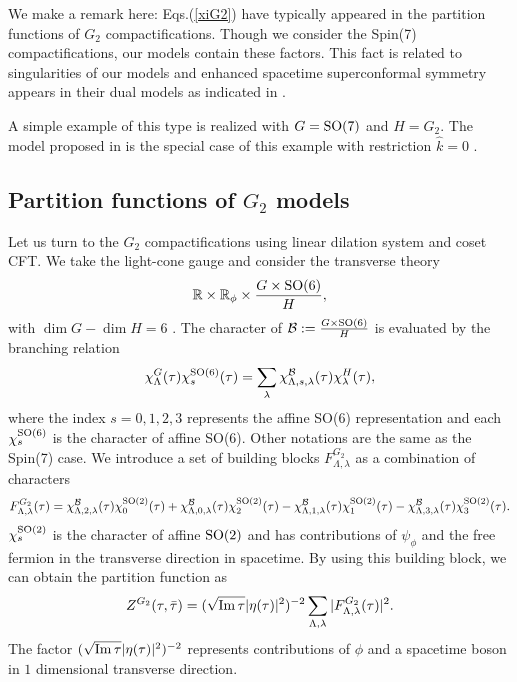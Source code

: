 \documentclass[a4paper,12pt]{article}
\numberwithin{equation}{section}
\newcommand{\Rb}{\mathbb{R}}
\newcommand{\im}{{\rm Im}\,}
\newcommand{\G}[1]{\mbox{$G_{#1}$}}
\newcommand{\Spin}[1]{{\rm Spin}(#1)}
\newcommand{\SO}[1]{{\rm SO}(#1)}
\newcommand{\psil}{\psi_{\phi}}
\newcommand{\kh}{\hat{k}}
\newcommand{\Bcal}{{\cal B}}
\begin{document}
We make a remark here: Eqs.(\ref{xiG2}) have typically appeared in the
partition functions of \G2
compactifications\cite{Eguchi:2001xa,Sugiyama:2001qh,Yamaguchi:2001kq}.
 Though we consider the \Spin7 compactifications, our models contain 
these factors.
This fact is related to singularities of our models and 
enhanced spacetime 
superconformal symmetry appears in their dual models as indicated in 
\cite{Yamaguchi:2001kq}.

A simple example of this type is realized 
with $G=\SO 7$ and $H=\G2$. The model
proposed in \cite{Eguchi:2001xa} is the special case of this example
with restriction $\kh=0$ .


\subsection{Partition functions of \G 2 models}
\label{G2CFT}
Let us turn to the \G2 compactifications using linear dilation system
and coset CFT. We take the light-cone gauge and consider the
transverse theory
\begin{align*}
 \Rb\times \Rb_{\phi}\times \frac{G\times \SO 6}{H},
\end{align*}
with $\dim G-\dim H=6$ . The character of 
$\Bcal:=\frac{G\times \SO 6}{H}$ is evaluated by the branching relation 
\begin{align*}
 \chi^{G}_{\Lambda}(\tau)\chi^{\SO6}_{s}(\tau)
   =\sum_{\lambda}\chi^{\Bcal}_{\Lambda,s,\lambda}(\tau)
             \chi^{H}_{\lambda}(\tau),
\end{align*}
where the index $s=0,1,2,3$ represents the affine \SO6 representation and
each $\chi^{\SO6}_{s}$ is the character of affine \SO6. Other notations
are the same as the \Spin7 case. We introduce a  set of building blocks
$F^{G_2}_{\Lambda,\lambda}$ as a combination of characters
\begin{align*}
 F^{G_2}_{\Lambda,\lambda}(\tau)=
    \chi^{\Bcal}_{\Lambda,2,\lambda}(\tau)\chi^{\SO2}_{0}(\tau)
   +\chi^{\Bcal}_{\Lambda,0,\lambda}(\tau)\chi^{\SO2}_{2}(\tau)
   -\chi^{\Bcal}_{\Lambda,1,\lambda}(\tau)\chi^{\SO2}_{1}(\tau)
   -\chi^{\Bcal}_{\Lambda,3,\lambda}(\tau)\chi^{\SO2}_{3}(\tau).
\end{align*}
$\chi^{\SO2}_{s}$ is the character of affine $\SO2$ and has
contributions 
of $\psil$ and the free fermion in the transverse  direction 
in spacetime.
By using this building block, 
we can obtain the partition function as
\begin{align*}
 Z^{G_2}(\tau ,\bar{\tau})=(\sqrt{\im\tau}|\eta(\tau)|^2)^{-2}
  \sum_{\Lambda,\lambda}|F^{G_2}_{\Lambda,\lambda}(\tau)|^2.
\end{align*}
The factor $(\sqrt{\im\tau}|\eta(\tau)|^2)^{-2}$ represents 
contributions of $\phi$ and a spacetime  boson in $1$ dimensional 
transverse direction.
\end{document}
